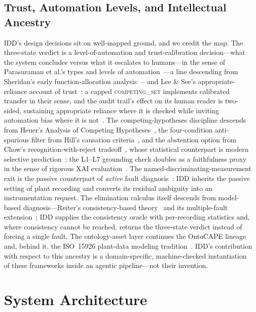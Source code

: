 \documentclass[preprint,10pt]{elsarticle}
\begin{document}
\subsection{Trust, Automation Levels, and Intellectual Ancestry}\label{sec:trust}
IDD's design decisions sit on well-mapped ground, and we credit the map. The three-state verdict is a level-of-automation and trust-calibration decision---what the system concludes versus what it escalates to humans---in the sense of Parasuraman et al.'s types and levels of automation~\cite{parasuraman2000model}---a line descending from Sheridan's early function-allocation analysis~\cite{sheridan1978human}---and Lee \& See's appropriate-reliance account of trust~\cite{lee2004trust}: a capped \mbox{\textsc{competing\_set}} implements calibrated transfer in their sense, and the audit trail's effect on its human reader is two-sided, sustaining appropriate reliance where it is checked while inviting automation bias where it is not~\cite{parasuraman2010complacency,bainbridge1983ironies}. The competing-hypotheses discipline descends from Heuer's Analysis of Competing Hypotheses~\cite{heuer1999psychology}, the four-condition anti-spurious filter from Hill's causation criteria~\cite{hill1965environment}, and the abstention option from Chow's recognition-with-reject tradeoff~\cite{chow1970optimum}, whose statistical counterpart is modern selective prediction~\cite{angelopoulos2023conformal}; the L1--L7 grounding check doubles as a faithfulness proxy in the sense of rigorous XAI evaluation~\cite{doshivelez2017rigorous}. The named-discriminating-measurement exit is the passive counterpart of \emph{active} fault diagnosis~\cite{scott2014input}: IDD inherits the passive setting of plant recording and converts its residual ambiguity into an instrumentation request. The elimination calculus itself descends from model-based diagnosis---Reiter's consistency-based theory~\cite{reiter1987theory} and its multiple-fault extension~\cite{dekleer1987diagnosing}; IDD supplies the consistency oracle with per-recording statistics and, where consistency cannot be reached, returns the three-state verdict instead of forcing a single fault. The ontology-asset layer continues the OntoCAPE lineage~\cite{morbach2009ontocape} and, behind it, the ISO~15926 plant-data modeling tradition~\cite{iso15926}. IDD's contribution with respect to this ancestry is a domain-specific, machine-checked instantiation of these frameworks inside an agentic pipeline---not their invention.

\section{System Architecture}
\label{sec:arch}
\end{document}
